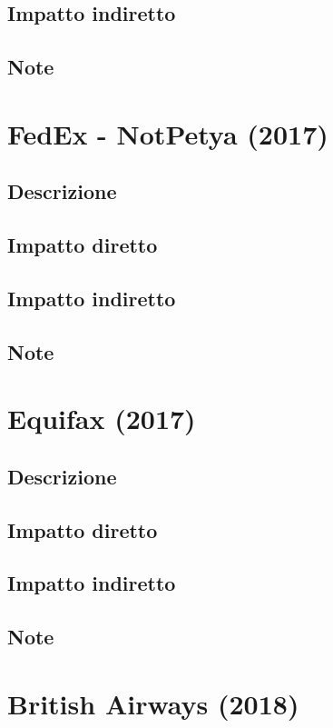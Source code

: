 \documentclass[12pt,a4paper,openright,twoside]{report}
\begin{document}
\subsection{Impatto indiretto}

\subsection{Note}
\section{FedEx - NotPetya (2017)}
\subsection{Descrizione}

\subsection{Impatto diretto}

\subsection{Impatto indiretto}

\subsection{Note}
\section{Equifax (2017)}
\subsection{Descrizione}

\subsection{Impatto diretto}

\subsection{Impatto indiretto}

\subsection{Note}
\section{British Airways (2018)}
\end{document}

